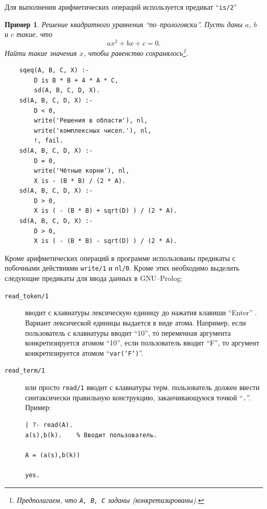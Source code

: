 \documentclass[12pt, openany, twoside]{book} %
\newtheorem{example}{Пример}[chapter]
\begin{document}
Для выполнения арифметических операций используется предикат ``{\tt is/2}''
\begin{example}
Решение квадратного уравнения ``по--прологовски''. Пусть даны $a$, $b$ и $c$ такие, что
$$
    ax^2+bx+c=0.
$$
Найти такие значения $x$, чтобы равенство сохранялось\footnote{Предполагаем, что {\tt A, B, C} заданы (конкретизированы).}.
\end{example}
{\tt\begin{verbatim}
    sqeq(A, B, C, X) :-
        D is B * B + 4 * A * C,
        sd(A, B, C, D, X).
    sd(A, B, C, D, X) :-
        D < 0,
        write('Решения в области'), nl,
        write('комплексных чисел.'), nl,
        !, fail.
    sd(A, B, C, D, X) :-
        D = 0,
        write('Чётные корни'), nl,
        X is - (B * B) / (2 * A).
    sd(A, B, C, D, X) :-
        D > 0,
        X is ( - (B * B) + sqrt(D) ) / (2 * A).
    sd(A, B, C, D, X) :-
        D > 0,
        X is ( - (B * B) - sqrt(D) ) / (2 * A).
\end{verbatim}}

Кроме арифметических операций в программе использованы предикаты с побочными действиями {\tt write/1} и {\tt nl/0}. Кроме этих необходимо выделить следующие предикаты для ввода данных в GNU--Prolog:
\begin{description}
\item[\tt read\_token/1] вводит с клавиатуры лексическую единицу до нажатия клавиши ``Enter'' . Вариант лексической единицы выдается в виде атома. Например, если пользователь с клавиатуры вводит ``10'', то переменная аргумента конкретизируется атомом ``10'', если пользователь вводит ``F'', то аргумент конкретизируется атомом ``\texttt{var(`F`)}''.
\item[\tt read\_term/1] или просто \texttt{read/1} вводит с клавиатуры терм. пользователь должен ввести синтаксически правильную конструкцию, заканчивающуюся точкой ``\texttt{.}''. Пример:
{\tt\begin{verbatim}
| ?- read(A).
a(s),b(k).    % Вводит пользователь.

A = (a(s),b(k))

yes.
\end{verbatim}}
\end{description}
\end{document}
